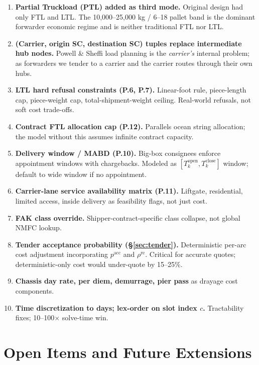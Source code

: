 \documentclass[11pt,a4paper]{article}
\theoremstyle{definition}
\begin{document}
\begin{enumerate}[noitemsep]
  \item \textbf{Partial Truckload (PTL) added as third mode.} Original design had only
        FTL and LTL. The 10{,}000--25{,}000 kg / 6--18 pallet band is the dominant
        forwarder economic regime and is neither traditional FTL nor LTL.
  \item \textbf{(Carrier, origin SC, destination SC) tuples replace intermediate hub nodes.}
        Powell \& Sheffi load planning is the \emph{carrier's} internal problem; as
        forwarders we tender to a carrier and the carrier routes through their own hubs.
  \item \textbf{LTL hard refusal constraints (P.6, P.7).} Linear-foot rule, piece-length
        cap, piece-weight cap, total-shipment-weight ceiling. Real-world refusals, not
        soft cost trade-offs.
  \item \textbf{Contract FTL allocation cap (P.12).} Parallels ocean string allocation;
        the model without this assumes infinite contract capacity.
  \item \textbf{Delivery window / MABD (P.10).} Big-box consignees enforce appointment
        windows with chargebacks. Modeled as $[T_k^{\text{open}}, T_k^{\text{close}}]$
        window; default to wide window if no appointment.
  \item \textbf{Carrier-lane service availability matrix (P.11).} Liftgate, residential,
        limited access, inside delivery as feasibility flags, not just cost.
  \item \textbf{FAK class override.} Shipper-contract-specific class collapse, not global
        NMFC lookup.
  \item \textbf{Tender acceptance probability (\S\ref{sec:tender}).} Deterministic per-arc
        cost adjustment incorporating $p^{\text{acc}}$ and $\rho^{\text{re}}$. Critical
        for accurate quotes; deterministic-only cost would under-quote by 15--25\%.
  \item \textbf{Chassis day rate, per diem, demurrage, pier pass} as drayage cost
        components.
  \item \textbf{Time discretization to days; lex-order on slot index $c$.} Tractability
        fixes; 10--100$\times$ solve-time win.
\end{enumerate}

\section{Open Items and Future Extensions}
\end{document}
